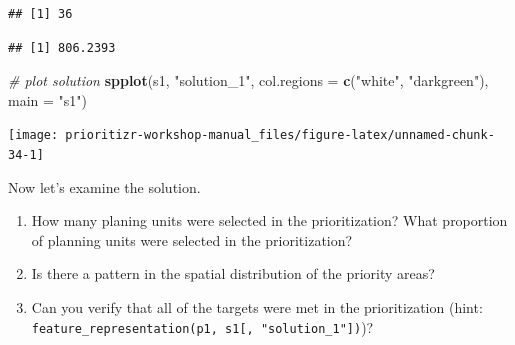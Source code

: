 \documentclass[12pt,]{book}
\newenvironment{Shaded}{\begin{snugshade}}{\end{snugshade}}
\newcommand{\KeywordTok}[1]{\textcolor[rgb]{0.13,0.29,0.53}{\textbf{#1}}}
\newcommand{\DataTypeTok}[1]{\textcolor[rgb]{0.13,0.29,0.53}{#1}}
\newcommand{\DecValTok}[1]{\textcolor[rgb]{0.00,0.00,0.81}{#1}}
\newcommand{\StringTok}[1]{\textcolor[rgb]{0.31,0.60,0.02}{#1}}
\newcommand{\CommentTok}[1]{\textcolor[rgb]{0.56,0.35,0.01}{\textit{#1}}}
\newcommand{\OperatorTok}[1]{\textcolor[rgb]{0.81,0.36,0.00}{\textbf{#1}}}
\newcommand{\NormalTok}[1]{#1}
\providecommand{\tightlist}{%
  \setlength{\itemsep}{0pt}\setlength{\parskip}{0pt}}
\let\BeginKnitrBlock\begin \let\EndKnitrBlock\end
\begin{document}
\begin{Shaded}
\end{Shaded}

\begin{verbatim}
## [1] 36
\end{verbatim}

\begin{Shaded}
\end{Shaded}

\begin{verbatim}
## [1] 806.2393
\end{verbatim}

\begin{Shaded}
\begin{Highlighting}[]
\CommentTok{# plot solution}
\KeywordTok{spplot}\NormalTok{(s1, }\StringTok{"solution_1"}\NormalTok{, }\DataTypeTok{col.regions =} \KeywordTok{c}\NormalTok{(}\StringTok{"white"}\NormalTok{, }\StringTok{"darkgreen"}\NormalTok{), }\DataTypeTok{main =} \StringTok{"s1"}\NormalTok{)}
\end{Highlighting}
\end{Shaded}

\begin{center}\texttt{[image: prioritizr-workshop-manual\_files/figure-latex/unnamed-chunk-34-1]} \end{center}

Now let's examine the solution.

\BeginKnitrBlock{rmdquestion}
\begin{enumerate}
\def\labelenumi{\arabic{enumi}.}
\tightlist
\item
  How many planing units were selected in the prioritization? What
  proportion of planning units were selected in the prioritization?
\item
  Is there a pattern in the spatial distribution of the priority areas?
\item
  Can you verify that all of the targets were met in the prioritization
  (hint:
  \texttt{feature\_representation(p1,\ s1{[},\ "solution\_1"{]})})?
\end{enumerate}
\EndKnitrBlock{rmdquestion}
\end{document}
